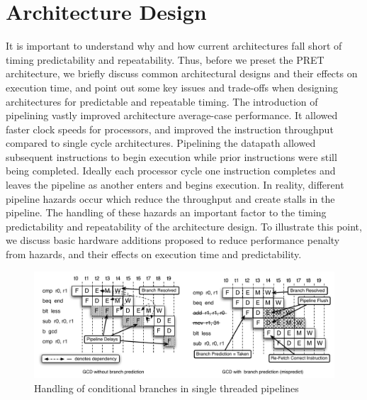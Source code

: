 \section{Architecture Design}
It is important to understand why and how current architectures fall short of timing predictability and repeatability.
Thus, before we preset the PRET architecture, we briefly discuss common architectural designs and their effects on execution time, and point out some key issues and trade-offs when designing architectures for predictable and repeatable timing.
The introduction of pipelining vastly improved architecture average-case performance.
It allowed faster clock speeds for processors, and improved the instruction throughput compared to single cycle architectures.
Pipelining the datapath allowed subsequent instructions to begin execution while prior instructions were still being completed. 
Ideally each processor cycle one instruction completes and leaves the pipeline as another enters and begins execution. 
In reality, different pipeline hazards occur which reduce the throughput and create stalls in the pipeline.
The handling of these hazards an important factor to the timing predictability and repeatability of the architecture design.     
To illustrate this point, we discuss basic hardware additions proposed to reduce performance penalty from hazards, and their effects on execution time and predictability. 
  
\begin{figure}
\begin{center}
\includegraphics[scale=.58]{figs/branch_execution_non_interleaved_pipeline}
\end{center}
\vspace{-10pt}
\caption{Handling of conditional branches in single threaded pipelines}
\label{fig:branch_execution_non_interleaved_pipeline}
\end{figure}
  
